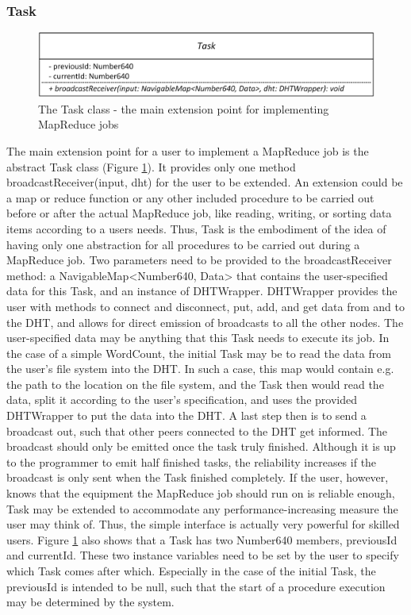 \subsubsection{Task}
\begin{figure}
	\centering	
	\includegraphics{imgs/taskclass}
	\caption{The Task class - the main extension point for implementing MapReduce jobs}	
	\label{fig:taskclass}
\end{figure}  
The main extension point for a user to implement a MapReduce job is the abstract Task class (Figure \ref{fig:taskclass}). It provides only one method broadcastReceiver(input, dht) for the user to be extended. An extension could be a map or reduce function or any other included procedure to be carried out before or after the actual MapReduce job, like reading, writing, or sorting data items according to a users needs. Thus, Task is the embodiment of the idea of having only one abstraction for all procedures to be carried out during a MapReduce job. Two parameters need to be provided to the broadcastReceiver method: a NavigableMap<Number640, Data> that contains the user-specified data for this Task, and an instance of DHTWrapper. DHTWrapper provides the user with methods to connect and disconnect, put, add, and get data from and to the DHT, and allows for direct emission of broadcasts to all the other nodes. The user-specified data may be anything that this Task needs to execute its job. In the case of a simple WordCount, the initial Task may be to read the data from the user's file system into the DHT. In such a case, this map would contain e.g. the path to the location on the file system, and the Task then would read the data, split it according to the user's specification, and uses the provided DHTWrapper to put the data into the DHT. A last step then is to send a broadcast out, such that other peers connected to the DHT get informed. The broadcast should only be emitted once the task truly finished. Although it is up to the programmer to emit half finished tasks, the reliability increases if the broadcast is only sent when the Task finished completely. If the user, however, knows that the equipment the MapReduce job should run on is reliable enough, Task may be extended to accommodate any performance-increasing measure the user may think of. Thus, the simple interface is actually very powerful for skilled users. Figure \ref{fig:taskclass} also shows that a Task has two Number640 members, previousId and currentId. These two instance variables need to be set by the user to specify which Task comes after which. Especially in the case of the initial Task, the previousId is intended to be null, such that the start of a procedure execution may be determined by the system.
